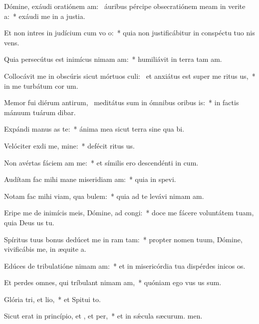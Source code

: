 \item Dómine, exáudi oratiónem am:~\pscross{} áuribus pércipe obsecratiónem meam in verite a:~* exáudi me in a justia.
\item Et non intres in judícium cum vo o:~* quia non justificábitur in conspéctu tuo nis vens.
\item Quia persecútus est inimícus nimam am:~* humiliávit in terra tam am.
\item Collocávit me in obscúris sicut mórtuos culi:~\pscross{} et anxiátus est super me ritus us,~* in me turbátum  cor um.
\item Memor fui diérum antirum,~\pscross{} meditátus sum in ómnibus oribus is:~* in factis mánuum tuárum dibar.
\item Expándi manus as  te:~* ánima mea sicut terra sine qua bi.
\item Velóciter exdi me, mine:~* defécit ritus us.
\item Non avértas fáciem am  me:~* et símilis ero descendénti in cum.
\item Audítam fac mihi mane miseridiam am:~* quia in  spevi.
\item Notam fac mihi viam,  qua bulem:~* quia ad te levávi nimam am.
\item Eripe me de inimícis meis, Dómine, ad  congi:~* doce me fácere voluntátem tuam, quia Deus us  tu.
\item Spíritus tuus bonus dedúcet me in ram tam:~* propter nomen tuum, Dómine, vivificábis me, in æquite a.
\item Edúces de tribulatióne nimam am:~* et in misericórdia tua dispérdes inicos os.
\item Et perdes omnes, qui tríbulant nimam am,~* quóniam ego vus us sum.
\item Glória tri, et lio,~* et Spitui to.
\item Sicut erat in princípio, et , et per,~* et in sǽcula sæcurum. men.
